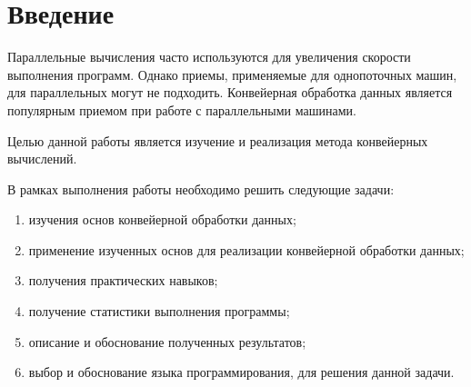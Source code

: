 \newpage
\chapter*{Введение}
Параллельные вычисления часто используются для увеличения скорости выполнения
программ. Однако приемы, применяемые для однопоточных машин, для
параллельных могут не подходить. Конвейерная обработка данных является
популярным приемом при работе с параллельными машинами.


Целью данной работы является изучение и реализация метода конвейерных вычислений.

В рамках выполнения работы необходимо решить следующие задачи:

\begin{enumerate}
	\item изучения основ конвейерной обработки данных;
	\item применение изученных основ для реализации конвейерной обработки данных;
	\item получения практических навыков;
	\item получение статистики выполнения программы;
	\item описание и обоснование полученных результатов;
	\item выбор и обоснование языка программирования, для решения данной задачи.
\end{enumerate}